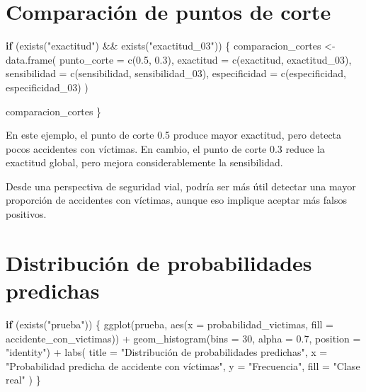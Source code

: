 \documentclass[
  11pt,
  letterpaper,
]{book}
\newenvironment{Shaded}{\begin{snugshade}}{\end{snugshade}}
\newcommand{\AttributeTok}[1]{\textcolor[rgb]{0.40,0.45,0.13}{#1}}
\newcommand{\ControlFlowTok}[1]{\textcolor[rgb]{0.00,0.23,0.31}{\textbf{#1}}}
\newcommand{\DecValTok}[1]{\textcolor[rgb]{0.68,0.00,0.00}{#1}}
\newcommand{\FloatTok}[1]{\textcolor[rgb]{0.68,0.00,0.00}{#1}}
\newcommand{\FunctionTok}[1]{\textcolor[rgb]{0.28,0.35,0.67}{#1}}
\newcommand{\NormalTok}[1]{\textcolor[rgb]{0.00,0.23,0.31}{#1}}
\newcommand{\OtherTok}[1]{\textcolor[rgb]{0.00,0.23,0.31}{#1}}
\newcommand{\SpecialCharTok}[1]{\textcolor[rgb]{0.37,0.37,0.37}{#1}}
\newcommand{\StringTok}[1]{\textcolor[rgb]{0.13,0.47,0.30}{#1}}
\begin{document}
\section{Comparación de puntos de
corte}\label{comparaciuxf3n-de-puntos-de-corte}

\begin{Shaded}
\begin{Highlighting}[]
\ControlFlowTok{if}\NormalTok{ (}\FunctionTok{exists}\NormalTok{(}\StringTok{"exactitud"}\NormalTok{) }\SpecialCharTok{\&\&} \FunctionTok{exists}\NormalTok{(}\StringTok{"exactitud\_03"}\NormalTok{)) \{}
\NormalTok{  comparacion\_cortes }\OtherTok{\textless{}{-}} \FunctionTok{data.frame}\NormalTok{(}
    \AttributeTok{punto\_corte =} \FunctionTok{c}\NormalTok{(}\FloatTok{0.5}\NormalTok{, }\FloatTok{0.3}\NormalTok{),}
    \AttributeTok{exactitud =} \FunctionTok{c}\NormalTok{(exactitud, exactitud\_03),}
    \AttributeTok{sensibilidad =} \FunctionTok{c}\NormalTok{(sensibilidad, sensibilidad\_03),}
    \AttributeTok{especificidad =} \FunctionTok{c}\NormalTok{(especificidad, especificidad\_03)}
\NormalTok{  )}

\NormalTok{  comparacion\_cortes}
\NormalTok{\}}
\end{Highlighting}
\end{Shaded}

En este ejemplo, el punto de corte 0.5 produce mayor exactitud, pero
detecta pocos accidentes con víctimas. En cambio, el punto de corte 0.3
reduce la exactitud global, pero mejora considerablemente la
sensibilidad.

Desde una perspectiva de seguridad vial, podría ser más útil detectar
una mayor proporción de accidentes con víctimas, aunque eso implique
aceptar más falsos positivos.

\section{Distribución de probabilidades
predichas}\label{distribuciuxf3n-de-probabilidades-predichas}

\begin{Shaded}
\begin{Highlighting}[]
\ControlFlowTok{if}\NormalTok{ (}\FunctionTok{exists}\NormalTok{(}\StringTok{"prueba"}\NormalTok{)) \{}
  \FunctionTok{ggplot}\NormalTok{(prueba, }\FunctionTok{aes}\NormalTok{(}\AttributeTok{x =}\NormalTok{ probabilidad\_victimas, }\AttributeTok{fill =}\NormalTok{ accidente\_con\_victimas)) }\SpecialCharTok{+}
    \FunctionTok{geom\_histogram}\NormalTok{(}\AttributeTok{bins =} \DecValTok{30}\NormalTok{, }\AttributeTok{alpha =} \FloatTok{0.7}\NormalTok{, }\AttributeTok{position =} \StringTok{"identity"}\NormalTok{) }\SpecialCharTok{+}
    \FunctionTok{labs}\NormalTok{(}
      \AttributeTok{title =} \StringTok{"Distribución de probabilidades predichas"}\NormalTok{,}
      \AttributeTok{x =} \StringTok{"Probabilidad predicha de accidente con víctimas"}\NormalTok{,}
      \AttributeTok{y =} \StringTok{"Frecuencia"}\NormalTok{,}
      \AttributeTok{fill =} \StringTok{"Clase real"}
\NormalTok{    )}
\NormalTok{\}}
\end{Highlighting}
\end{Shaded}
\end{document}
